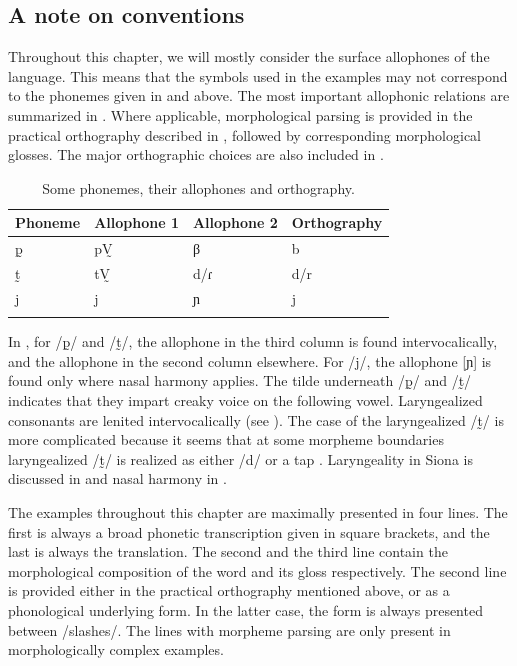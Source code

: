\documentclass[output=paper]{langscibook}
\begin{document}
\subsection{A note on conventions}\label{conv}
Throughout this chapter, we will mostly consider the surface allophones of the language. This means that the symbols used in the examples may not correspond to the phonemes given in  and  above. The most important allophonic relations are summarized in . Where applicable, morphological parsing is provided in the practical orthography described in \citet[129--132]{Bruil:2014}, followed by corresponding morphological glosses. The major orthographic choices are also included in . 


\begin{table}\centering
\begin{tabular}{llll}\lsptoprule
Phoneme 	&	Allophone 1  &  Allophone 2 & Orthography			\\ \midrule
p̰	&	pV̰    &  β	         	     &	b					\\
t̰	&	tV̰    &   d/ɾ		    	&	d/r	     \\
j		    &	j			   &	ɲ				&	 j\\ \lspbottomrule
\end{tabular}\caption{Some phonemes, their allophones and orthography.}\label{tab-allophon}
\end{table}

In , for /p̰/ and /t̰/, the allophone in the third column is found intervocalically, and the allophone in the second column elsewhere. For \mbox{/j/}, the allophone [ɲ] is found only where nasal harmony applies. The tilde underneath \mbox{/p̰/} and \mbox{/t̰/} indicates that they impart creaky voice on the following vowel. Laryngealized consonants are lenited intervocalically (see \citealt[93--95]{Bruil:2014}). The case of the laryngealized /t̰/ is more complicated because it seems that at some morpheme boundaries laryngealized /t̰/ is realized as either \mbox{/d/} or a tap \citep[94]{Bruil:2014}. Laryngeality in Siona is discussed in  and nasal harmony in .
 
The examples throughout this chapter are maximally presented in four lines. The first is always a broad phonetic transcription given in square brackets, and the last is always the translation. The second and the third line contain the morphological composition of the word and its gloss respectively. The second line is provided either in the practical orthography mentioned above, or as a phonological underlying form. In the latter case, the form is always presented between \mbox{/slashes/}. The lines with morpheme parsing are only present in morphologically complex examples.
\end{document}
